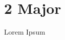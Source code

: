 \documentclass[tom-ari]{subfile}
\begin{document}
	
	\chapter{2 Major}
	
	Lorem Ipsum
	
	\lipsum[4]
	
\end{document}
